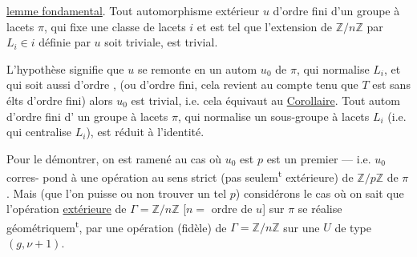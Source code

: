 \uline{lemme fondamental}. Tout automorphisme 
extérieur $u$ d'ordre fini  d'un groupe à
lacets $\pi$, qui fixe une classe de lacets
$i$ et est tel que l'extension de $\mathbb Z/n\mathbb Z$
par $L_i\in i$ définie par $u$ soit triviale,
est trivial.

L'hypothèse signifie que $u$ se remonte
en un autom $u_0$ de $\pi$, qui
normalise $L_i$, et qui soit aussi d'ordre ,
(ou d'ordre fini, cela revient au  compte tenu
que  $T$ est sans élts d'ordre fini)
alors $u_0$ est trivial, i.e. cela équivaut au
\uline{Corollaire}. Tout autom  d'ordre fini  d'
un groupe à lacets $\pi$,  qui normalise
un sous-groupe à lacets $L_i$ (i.e. qui
centralise $L_i$), est réduit à l'identité.

Pour le démontrer, on est ramené  au
cas où $u_0$ est  
$p$ est un  premier --- i.e. $u_0$ corres-
pond à une opération au sens strict
(pas seulem\textsuperscript{t} extérieure) de $\mathbb Z/p\mathbb Z$  
de $\pi$. Mais (que l'on puisse ou non
trouver un tel $p$) considérons le cas où
on sait que l'opération \uline{extérieure} de
$\Gamma=\mathbb Z/n\mathbb Z$ [$n=$ ordre de $u$] sur $\pi$ se réalise
géométriquem\textsuperscript{t}, par une opération (fidèle)
de $\Gamma=\mathbb Z/n\mathbb Z$ sur une $U$ de type $(g,\nu+1)$.

